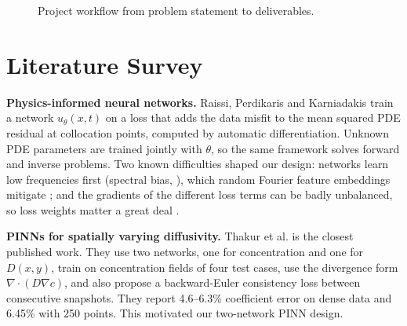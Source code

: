 \documentclass[twoside,english]{article}
\begin{document}
\begin{figure}[H]
\centering
{}
\caption{Project workflow from problem statement to deliverables.}\label{fig:workflow}
\end{figure}

\section{Literature Survey} \label{sec:litsurvey}

\textbf{Physics-informed neural networks.} Raissi, Perdikaris and Karniadakis \citep{raissi2019} train a network $u_\theta(x,t)$ on a loss that adds the data misfit to the mean squared PDE residual at collocation points, computed by automatic differentiation. Unknown PDE parameters are trained jointly with $\theta$, so the same framework solves forward and inverse problems. Two known difficulties shaped our design: networks learn low frequencies first (spectral bias, \citep{rahaman2019}), which random Fourier feature embeddings mitigate \citep{tancik2020}; and the gradients of the different loss terms can be badly unbalanced, so loss weights matter a great deal \citep{wang2021}.

\textbf{PINNs for spatially varying diffusivity.} Thakur et al. \citep{thakur2024} is the closest published work. They use two networks, one for concentration and one for $D(x,y)$, train on concentration fields of four test cases, use the divergence form $\nabla\cdot(D\nabla c)$, and also propose a backward-Euler consistency loss between consecutive snapshots. They report 4.6--6.3\% coefficient error on dense data and 6.45\% with 250 points. This motivated our two-network PINN design.
\end{document}
